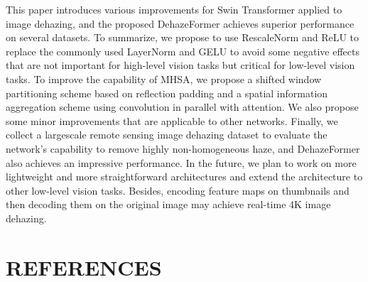 This paper introduces various improvements for Swin Transformer applied to image dehazing, and the proposed DehazeFormer achieves superior performance on several datasets. To summarize, we propose to use RescaleNorm and ReLU to replace the commonly used LayerNorm and GELU to avoid some negative effects that are not important for high-level vision tasks but critical for low-level vision tasks. To improve the capability of MHSA, we propose a shifted window partitioning scheme based on reflection padding and a spatial information aggregation scheme using convolution in parallel with attention. We also propose some minor improvements that are applicable to other networks. Finally, we collect a largescale remote sensing image dehazing dataset to evaluate the network’s capability to remove highly non-homogeneous haze, and DehazeFormer also achieves an impressive performance. In the future, we plan to work on more lightweight and more straightforward architectures and extend the architecture to other low-level vision tasks. Besides, encoding feature maps on thumbnails and then decoding them on the original image may achieve real-time 4K image dehazing.

\section{REFERENCES}

